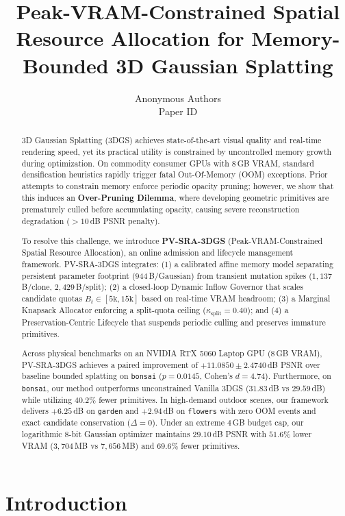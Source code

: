\documentclass[10pt,twocolumn,letterpaper]{article}
\title{Peak-VRAM-Constrained Spatial Resource Allocation for Memory-Bounded 3D Gaussian Splatting}
\author{
Anonymous Authors\\
Paper ID \paperID
}
\begin{document}
\maketitle

\begin{abstract}
3D Gaussian Splatting (3DGS) achieves state-of-the-art visual quality and real-time rendering speed, yet its practical utility is constrained by uncontrolled memory growth during optimization. On commodity consumer GPUs with 8\,GB VRAM, standard densification heuristics rapidly trigger fatal Out-Of-Memory (OOM) exceptions. Prior attempts to constrain memory enforce periodic opacity pruning; however, we show that this induces an \textbf{Over-Pruning Dilemma}, where developing geometric primitives are prematurely culled before accumulating opacity, causing severe reconstruction degradation ($>10$\,dB PSNR penalty). 

To resolve this challenge, we introduce \textbf{PV-SRA-3DGS} (Peak-VRAM-Constrained Spatial Resource Allocation), an online admission and lifecycle management framework. PV-SRA-3DGS integrates: (1) a calibrated affine memory model separating persistent parameter footprint ($944$\,B/Gaussian) from transient mutation spikes ($1{,}137$\,B/clone, $2{,}429$\,B/split); (2) a closed-loop Dynamic Inflow Governor that scales candidate quotas $B_t \in [5\text{k}, 15\text{k}]$ based on real-time VRAM headroom; (3) a Marginal Knapsack Allocator enforcing a split-quota ceiling ($\kappa_{\text{split}} = 0.40$); and (4) a Preservation-Centric Lifecycle that suspends periodic culling and preserves immature primitives. 

Across physical benchmarks on an NVIDIA RTX 5060 Laptop GPU (8\,GB VRAM), PV-SRA-3DGS achieves a paired improvement of $+11.0850 \pm 2.4740$\,dB PSNR over baseline bounded splatting on \texttt{bonsai} ($p = 0.0145$, Cohen's $d = 4.74$). Furthermore, on \texttt{bonsai}, our method outperforms unconstrained Vanilla 3DGS ($31.83$\,dB vs $29.59$\,dB) while utilizing $40.2\%$ fewer primitives. In high-demand outdoor scenes, our framework delivers $+6.25$\,dB on \texttt{garden} and $+2.94$\,dB on \texttt{flowers} with zero OOM events and exact candidate conservation ($\Delta = 0$). Under an extreme $4$\,GB budget cap, our logarithmic 8-bit Gaussian optimizer maintains $29.10$\,dB PSNR with $51.6\%$ lower VRAM ($3{,}704$\,MB vs $7{,}656$\,MB) and $69.6\%$ fewer primitives.
\end{abstract}

\section{Introduction}
\end{document}
